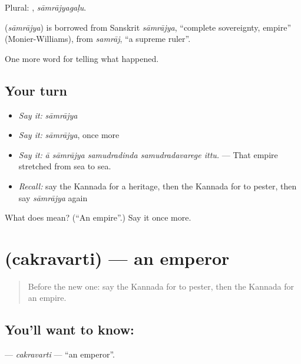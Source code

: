 Plural: , \emph{sāmrājyagaḷu}.

\begin{cousinweb}
\textbf{} (\emph{sāmrājya}) is borrowed from Sanskrit \emph{sāmrājya}, \textquotedblleft{}complete sovereignty, empire\textquotedblright{} (Monier-Williams), from \emph{samrāj}, \textquotedblleft{}a supreme ruler\textquotedblright{}.
\end{cousinweb}

\begin{grammarlens}[title={What you've built}]
One more word for telling what happened.
\end{grammarlens}

\subsection*{Your turn}
\begin{itemize}
\raggedright
  \item \emph{Say it:} \emph{sāmrājya}
  \item \emph{Say it:} \emph{sāmrājya}, once more
  \item \emph{Say it:} \emph{ā sāmrājya samudradinda samudradavarege ittu.} — That empire stretched from sea to sea.
  \item \emph{Recall:} say the Kannada for a heritage, then the Kannada for to pester, then say \emph{sāmrājya} again
\end{itemize}

\begin{tcolorbox}[breakable,colback=teal!4,colframe=teal!35!black,title={Before you move on}]
What does  mean? (\textquotedblleft{}An empire\textquotedblright{}.) Say it once more.
\end{tcolorbox}
\section[\texorpdfstring{\kn{ಚಕ್ರವರ್ತಿ} (cakravarti)}{ಚಕ್ರವರ್ತಿ (cakravarti)}]{ (cakravarti) — an emperor}

\label{lesson:KA-C354-cakravarti}



\begin{quote}
Before the new one: say the Kannada for to pester, then the Kannada for an empire.
\end{quote}

\subsection*{You'll want to know: }
\textbf{} — \emph{cakravarti} — \textquotedblleft{}an emperor\textquotedblright{}.

